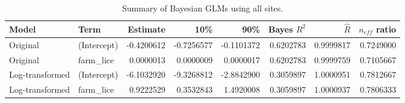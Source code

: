 \begin{table}
\centering
\caption{Summary of Bayesian GLMs using all sites.}
\centering
\begin{tabular}[t]{llrrrrrr}
\toprule
Model & Term & Estimate & 10\% & 90\% & Bayes $R^2$ & $\hat{R}$ & $n_{eff}$ ratio\\
\midrule
Original & (Intercept) & -0.4200612 & -0.7256577 & -0.1101372 & 0.6202783 & 0.9999817 & 0.7249000\\
Original & farm_lice & 0.0000013 & 0.0000009 & 0.0000017 & 0.6202783 & 0.9999759 & 0.7105667\\
Log-transformed & (Intercept) & -6.1032920 & -9.3268812 & -2.8842900 & 0.3059897 & 1.0000951 & 0.7812667\\
Log-transformed & farm_lice & 0.9222529 & 0.3532843 & 1.4920008 & 0.3059897 & 1.0000937 & 0.7806333\\
\bottomrule
\end{tabular}
\end{table}

